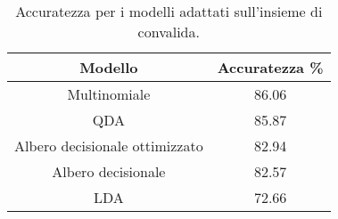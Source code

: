 \begin{table}[H]
\centering
\caption{Accuratezza per i modelli adattati sull'insieme di convalida.}
\begin{tabular}{cc}
\toprule
                        Modello &  Accuratezza \%  \\
\midrule
                   Multinomiale &          86.06 \\
                            QDA &          85.87 \\
 Albero decisionale ottimizzato &          82.94 \\
             Albero decisionale &          82.57 \\
                            LDA &          72.66 \\
\bottomrule
\end{tabular}
\label{tab:acc}
\end{table}